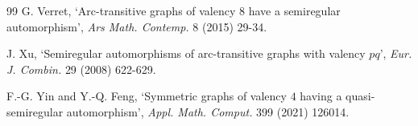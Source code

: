 \documentclass[12pt,reqno]{amsart}
\numberwithin {equation} {section}
\begin{document}
\begin{thebibliography}{99}
{\sc G. Verret}, `Arc-transitive graphs of valency $8$ have a semiregular automorphism', {\em Ars Math. Contemp. }8 (2015) 29-34.


{\sc J. Xu}, `Semiregular automorphisms of arc-transitive graphs with valency $pq$', {\em Eur. J. Combin. }29 (2008)  622-629.

{\sc F.-G. Yin} and {\sc Y.-Q. Feng}, `Symmetric graphs of valency $4$ having a quasi-semiregular automorphism', {\em Appl. Math. Comput. }399 (2021) 126014.

\end{thebibliography}


\end{document}

